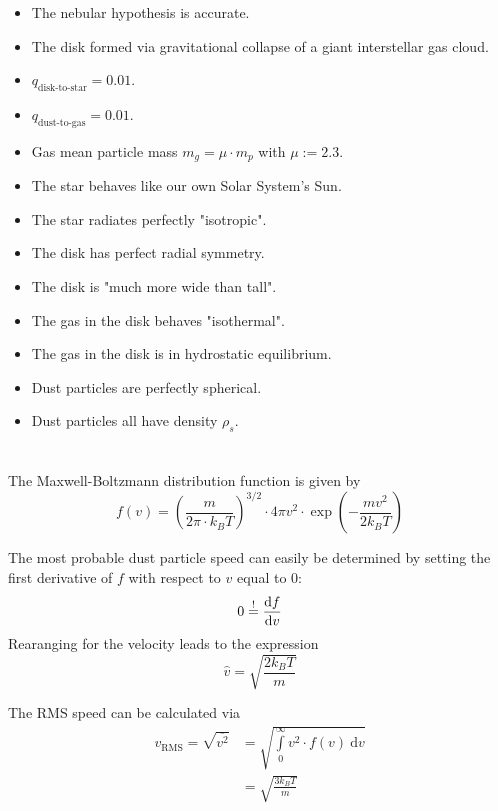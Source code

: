     \begin{itemize}
        \item The nebular hypothesis is accurate. 
        \item The disk formed via gravitational collapse of a giant interstellar gas cloud.
        \item $q_\text{disk-to-star}=0.01$.
        \item $q_\text{dust-to-gas}=0.01$.
        \item Gas mean particle mass $m_g=\mu\cdot m_p$ with $\mu:=2.3$.
        \item The star behaves like our own Solar System's Sun.
        \item The star radiates perfectly "isotropic".
        \item The disk has perfect radial symmetry.
        \item The disk is "much more wide than tall".
        \item The gas in the disk behaves "isothermal".
        \item The gas in the disk is in hydrostatic equilibrium.
        \item Dust particles are perfectly spherical.
        \item Dust particles all have density $\rho_s$.
    \end{itemize}

\section{}

    The Maxwell-Boltzmann distribution function is given by 
    \begin{equation}
        f(v)
        =\left(\frac{m}{2\pi\cdot k_BT}\right)^{3/2}
        \cdot4\pi v^2\cdot\exp\left(-\frac{mv^2}{2k_BT}\right)
    \end{equation}

    The most probable dust particle speed can easily be determined by 
    setting the first derivative of $f$ with respect to $v$ equal to 0:
    \begin{equation}
        0\overset{!}{=}\frac{\text{d} f}{\text{d} v}
    \end{equation}
    Rearanging for the velocity leads to the expression
    \begin{equation}
        \hat{v}=\sqrt{\frac{2k_BT}{m}}
    \end{equation}

    The RMS speed can be calculated via
    \begin{align}
        v_\text{RMS}
        =\sqrt{\overline{v^2}}
        &=\sqrt{\int\limits_0^\infty v^2\cdot f(v)\ \text{d}v}\\
        &=\sqrt{\frac{3k_BT}{m}}
    \end{align}

